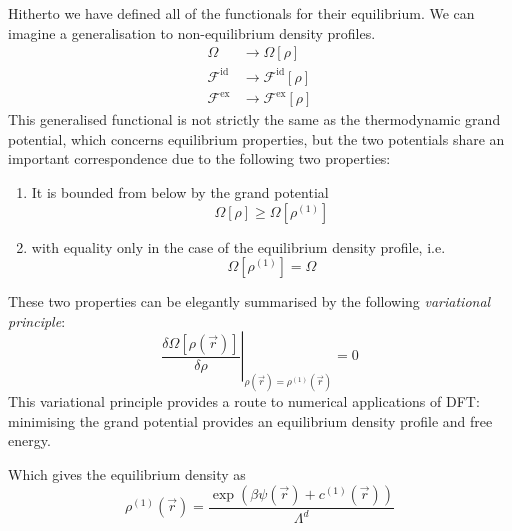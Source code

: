 Hitherto we have defined all of the functionals for their equilibrium.
We can imagine a generalisation to non-equilibrium density profiles.
\begin{align*}
  \Omega &\to \Omega[\rho]
  \\
  \mathcal{F}^\mathrm{id} &\to \mathcal{F}^\mathrm{id}[\rho]
  \\
  \mathcal{F}^\mathrm{ex} &\to \mathcal{F}^\mathrm{ex}[\rho]
\end{align*}
This generalised functional is not strictly the same as the thermodynamic grand potential, which concerns equilibrium properties, but the two potentials share an important correspondence due to the following two properties:
\begin{enumerate}
  \item It is bounded from below by the grand potential
    \begin{equation}
      \Omega[\rho] \ge \Omega[\rho^{(1)}]
    \end{equation}
  \item with equality only in the case of the equilibrium density profile, i.e.\
    \begin{equation}
      \Omega[\rho^{(1)}] = \Omega
    \end{equation}
\end{enumerate}
These two properties can be elegantly summarised by the following \emph{variational principle}:
\begin{equation}\label{eq:dft-equilibrium}
  \left.
  \frac{
    \delta \Omega[\rho(\vec{r})]
  }{
    \delta \rho
  }
  \right|_{\rho(\vec{r})=\rho^{(1)}(\vec{r})}
  =
  0
\end{equation}
This variational principle provides a route to numerical applications of DFT: minimising the grand potential provides an equilibrium density profile and free energy.

Which gives the equilibrium density as
\begin{equation}
  \rho^{(1)}(\vec{r})
  =
  \frac{
    \exp{\left(\beta\psi(\vec{r}) + c^{(1)}(\vec{r})\right)}
  }{ \Lambda^d }
\end{equation}
